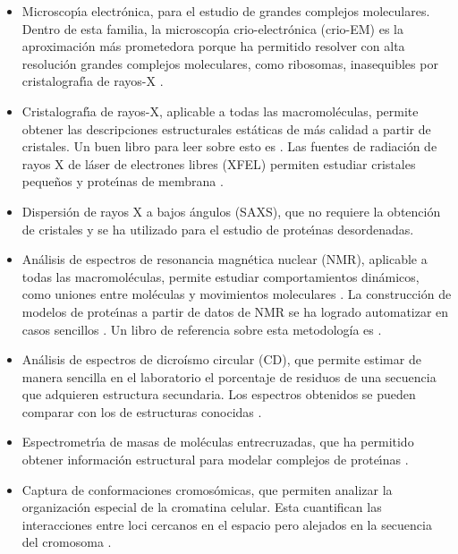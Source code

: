 \begin{itemize}


\item Microscop\'\i{}a electr\'{o}nica, para el estudio de grandes complejos moleculares. 
Dentro de esta familia, la microscop\'\i{}a crio-electr\'{o}nica (crio-EM) es la aproximaci\'{o}n m\'{a}s 
prometedora porque ha permitido resolver con alta resoluci\'{o}n grandes complejos moleculares, como ribosomas,
inasequibles por cristalograf\'\i{}a de rayos-X \citep{Callaway2015}.

\item Cristalograf\'\i{}a de rayos-X, aplicable a todas las macromol\'{e}culas, permite obtener 
las descripciones estructurales est\'{a}ticas de m\'{a}s calidad a partir de cristales. 
Un buen libro para leer sobre esto es \cite{Rhodes2000}. 
Las fuentes de radiaci\'{o}n de rayos X de l\'{a}ser de electrones libres (XFEL) permiten estudiar 
cristales peque\~{n}os y prote\'\i{}nas de membrana \citep{Marx2014}.

\item Dispersi\'{o}n de rayos X a bajos \'{a}ngulos (SAXS), que no requiere la obtenci\'{o}n de cristales y 
se ha utilizado para el estudio de prote\'\i{}nas desordenadas.

\item An\'{a}lisis de espectros de resonancia magn\'{e}tica nuclear (NMR), aplicable a todas las 
macromol\'{e}culas, permite estudiar comportamientos din\'{a}micos, como uniones entre mol\'{e}culas y 
movimientos moleculares \citep{Jiang2017}. La construcci\'{o}n de modelos de prote\'\i{}nas a partir de datos de NMR se 
ha logrado automatizar en casos sencillos \citep{Rosato2012,Liu2017}. 
Un libro de referencia sobre esta metodolog\'{i}a es \cite{Cavanagh2000}.

\item An\'{a}lisis de espectros de dicro\'{i}smo circular (CD), 
que permite estimar de manera sencilla en el laboratorio el porcentaje de residuos de una secuencia que adquieren estructura secundaria. 
Los espectros obtenidos se pueden comparar con los de estructuras conocidas \citep{Mavridis2016}. 

\item Espectrometr\'\i{}a de masas de mol\'{e}culas entrecruzadas, 
que ha permitido obtener informaci\'{o}n estructural para modelar complejos de prote\'\i{}nas \citep{Rappsilber2011}. 

\item Captura de conformaciones cromos\'{o}micas, que permiten analizar la organizaci\'{o}n especial de la cromatina celular. Esta 
cuantifican las interacciones entre loci cercanos en el espacio pero alejados en la secuencia del cromosoma \citep{bau_davide_2014_1066356}. 

\end{itemize}

